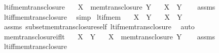\begin{isabellebody}
\isamarkupfalse%
\ lt{\isacharunderscore}{\kern0pt}if{\isacharunderscore}{\kern0pt}mem{\isacharunderscore}{\kern0pt}trans{\isacharunderscore}{\kern0pt}closure{\isacharcolon}{\kern0pt}\isanewline
\ \ \ {\isachardoublequoteopen}X\ {\isasymin}\ mem{\isacharunderscore}{\kern0pt}trans{\isacharunderscore}{\kern0pt}closure\ Y{\isachardoublequoteclose}\isanewline
\ \ \ {\isachardoublequoteopen}X\ {\isacharless}{\kern0pt}\ Y{\isachardoublequoteclose}\isanewline
%
\isadelimproof
\ \ %
\endisadelimproof
%
\isatagproof
{}\isamarkupfalse%
\ assms\ \isamarkupfalse%
\ lt{\isacharunderscore}{\kern0pt}iff{\isacharunderscore}{\kern0pt}mem{\isacharunderscore}{\kern0pt}trans{\isacharunderscore}{\kern0pt}closure\ \isamarkupfalse%
\ simp%
\endisatagproof
{\isafoldproof}%
%
\isadelimproof
\isanewline
%
\endisadelimproof
\isanewline
{}\isamarkupfalse%
\ lt{\isacharunderscore}{\kern0pt}if{\isacharunderscore}{\kern0pt}mem{\isacharcolon}{\kern0pt}\isanewline
\ \ \ {\isachardoublequoteopen}X\ {\isasymin}\ Y{\isachardoublequoteclose}\isanewline
\ \ \ {\isachardoublequoteopen}X\ {\isacharless}{\kern0pt}\ Y{\isachardoublequoteclose}\isanewline
%
\isadelimproof
\ \ %
\endisadelimproof
%
\isatagproof
{}\isamarkupfalse%
\ assms\ subset{\isacharunderscore}{\kern0pt}mem{\isacharunderscore}{\kern0pt}trans{\isacharunderscore}{\kern0pt}closure{\isacharunderscore}{\kern0pt}self\ lt{\isacharunderscore}{\kern0pt}if{\isacharunderscore}{\kern0pt}mem{\isacharunderscore}{\kern0pt}trans{\isacharunderscore}{\kern0pt}closure\ \isamarkupfalse%
\ auto%
\endisatagproof
{\isafoldproof}%
%
\isadelimproof
\isanewline
%
\endisadelimproof
\isanewline
{}\isamarkupfalse%
\ mem{\isacharunderscore}{\kern0pt}trans{\isacharunderscore}{\kern0pt}closure{\isacharunderscore}{\kern0pt}if{\isacharunderscore}{\kern0pt}lt{\isacharcolon}{\kern0pt}\isanewline
\ \ \ {\isachardoublequoteopen}X\ {\isacharless}{\kern0pt}\ Y{\isachardoublequoteclose}\isanewline
\ \ \ {\isachardoublequoteopen}X\ {\isasymin}\ mem{\isacharunderscore}{\kern0pt}trans{\isacharunderscore}{\kern0pt}closure\ Y{\isachardoublequoteclose}\isanewline
%
\isadelimproof
\ \ %
\endisadelimproof
%
\isatagproof
{}\isamarkupfalse%
\ assms\ \isamarkupfalse%
\ lt{\isacharunderscore}{\kern0pt}iff{\isacharunderscore}{\kern0pt}mem{\isacharunderscore}{\kern0pt}trans{\isacharunderscore}{\kern0pt}closure\ \isamarkupfalse%

\end{isabellebody}
